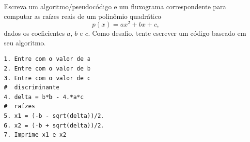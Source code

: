 \begin{exer}
  Escreva um algoritmo/pseudocódigo e um fluxograma correspondente para computar as raízes reais de um polinômio quadrático
  \begin{equation}
    p(x) = ax^2 + bx + c,
  \end{equation}
  dados os coeficientes $a$, $b$ e $c$. Como desafio, tente escrever um código {\python} baseado em seu algoritmo.
\end{exer}
\begin{resp}

\begin{verbatim}
1. Entre com o valor de a
2. Entre com o valor de b
3. Entre com o valor de c
#  discriminante
4. delta = b*b - 4.*a*c
#  raízes
5. x1 = (-b - sqrt(delta))/2.
6. x2 = (-b + sqrt(delta))/2.
7. Imprime x1 e x2
\end{verbatim}
  
\end{resp}


